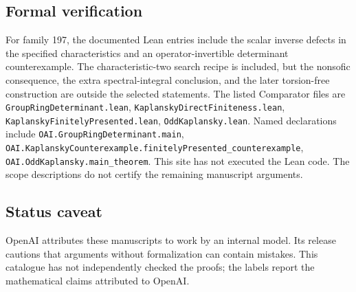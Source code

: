 \documentclass[11pt]{article}
\begin{document}
\subsection{Formal verification}
For family 197, the documented Lean entries include the scalar inverse defects in the specified characteristics and an operator-invertible determinant counterexample. The characteristic-two search recipe is included, but the nonsofic consequence, the extra spectral-integral conclusion, and the later torsion-free construction are outside the selected statements. The listed Comparator files are \texttt{GroupRingDeterminant.lean}, \texttt{KaplanskyDirectFiniteness.lean}, \texttt{KaplanskyFinitelyPresented.lean}, \texttt{OddKaplansky.lean}. Named declarations include \texttt{OAI.GroupRingDeterminant.main}, \texttt{OAI.KaplanskyCounterexample.finitelyPresented\_counterexample}, \texttt{OAI.OddKaplansky.main\_theorem}. This site has not executed the Lean code. The scope descriptions do not certify the remaining manuscript arguments.

\subsection{Status caveat}
OpenAI attributes these manuscripts to work by an internal model. Its release cautions that arguments without formalization can contain mistakes. This catalogue has not independently checked the proofs; the labels report the mathematical claims attributed to OpenAI.
\end{document}
